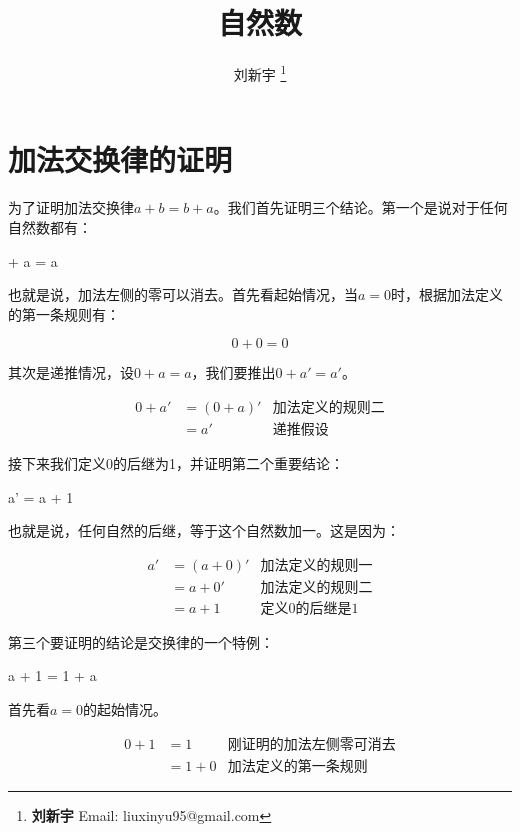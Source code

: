 \documentclass[UTF8]{article}
\begin{document}
\title{自然数}

\author{刘新宇
\thanks{{\bfseries 刘新宇} \newline
  Email: liuxinyu95@gmail.com \newline}
  }

\maketitle
\fi


\chapter*{加法交换律的证明}

为了证明加法交换律$a + b = b + a$。我们首先证明三个结论。第一个是说对于任何自然数都有：

 + a = a
\label{eq:left-zero}
\ee

也就是说，加法左侧的零可以消去。首先看起始情况，当$a=0$时，根据加法定义的第一条规则有：

\[
0 + 0 = 0
\]

其次是递推情况，设$0 + a = a$，我们要推出$0 + a' = a'$。

\[
\begin{array}{rlr}
0 + a' & = (0 + a)' & \text{加法定义的规则二} \\
       & = a' & \text{递推假设}
\end{array}
\]

接下来我们定义0的后继为1，并证明第二个重要结论：

\be
a' = a + 1
\label{eq:one-succ}
\ee

也就是说，任何自然的后继，等于这个自然数加一。这是因为：

\[
\begin{array}{rlr}
a' & = (a + 0)' & \text{加法定义的规则一} \\
   & = a + 0' & \text{加法定义的规则二} \\
   & = a + 1 & \text{定义0的后继是1}
\end{array}
\]

第三个要证明的结论是交换律的一个特例：

\be
a + 1 = 1 + a
\label{eq:one-commu}
\ee

首先看$a = 0$的起始情况。

\[
\begin{array}{rlr}
0 + 1 & = 1 & \text{刚证明的加法左侧零可消去} \\
      & = 1 + 0 & \text{加法定义的第一条规则}
\end{array}
\]
\end{document}
